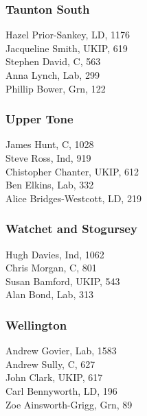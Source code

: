 \documentclass[a4paper,openany,10pt]{book}
\begin{document}
\subsubsection*{Taunton South}



Hazel Prior-Sankey, LD, 1176\\
Jacqueline Smith, UKIP, 619\\
Stephen David, C, 563\\
Anna Lynch, Lab, 299\\
Phillip Bower, Grn, 122\\


\subsubsection*{Upper Tone}



James Hunt, C, 1028\\
Steve Ross, Ind, 919\\
Chistopher Chanter, UKIP, 612\\
Ben Elkins, Lab, 332\\
{Alice Bridges-Westcott}, LD, 219\\


\subsubsection*{Watchet and Stogursey}



Hugh Davies, Ind, 1062\\
Chris Morgan, C, 801\\
Susan Bamford, UKIP, 543\\
Alan Bond, Lab, 313\\


\subsubsection*{Wellington}



Andrew Govier, Lab, 1583\\
Andrew Sully, C, 627\\
John Clark, UKIP, 617\\
Carl Bennyworth, LD, 196\\
Zoe Ainsworth-Grigg, Grn, 89\\
\end{document}
